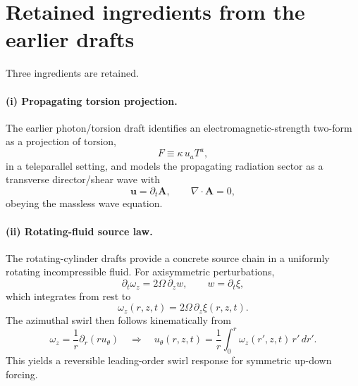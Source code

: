 \documentclass[11pt,a4paper]{article}
\begin{document}
\section{Retained ingredients from the earlier drafts}
Three ingredients are retained.

\paragraph{(i) Propagating torsion projection.} The earlier photon/torsion draft identifies an electromagnetic-strength two-form as a projection of torsion,
\begin{equation}
\label{eq:Ftorsion}
F \equiv \kappa\,u_a T^a,
\end{equation}
in a teleparallel setting, and models the propagating radiation sector as a transverse director/shear wave with
\begin{equation}
\label{eq:uA}
\mathbf{u}=\partial_t \mathbf{A},
\qquad
\nabla\cdot \mathbf{A}=0,
\end{equation}
obeying the massless wave equation.

\paragraph{(ii) Rotating-fluid source law.} The rotating-cylinder drafts provide a concrete source chain in a uniformly rotating incompressible fluid. For axisymmetric perturbations,
\begin{equation}
\label{eq:wz}
\partial_t \omega_z = 2\Omega\,\partial_z w,
\qquad
w=\partial_t \xi,
\end{equation}
which integrates from rest to
\begin{equation}
\label{eq:wzxi}
\omega_z(r,z,t)=2\Omega\,\partial_z \xi(r,z,t).
\end{equation}
The azimuthal swirl then follows kinematically from
\begin{equation}
\label{eq:utheta}
\omega_z = \frac{1}{r}\partial_r(r u_\theta)
\quad\Longrightarrow\quad
u_\theta(r,z,t)=\frac{1}{r}\int_0^r \omega_z(r',z,t)\,r'\,dr'.
\end{equation}
This yields a reversible leading-order swirl response for symmetric up-down forcing.
\end{document}
